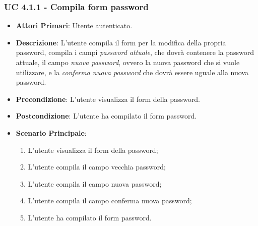 			\subsubsection{UC 4.1.1 - Compila form password}
			\begin{itemize}
				\item \textbf{Attori Primari}: Utente autenticato.
				\item \textbf{Descrizione}: L'utente compila il form per la modifica della propria password, compila i campi \textit{password attuale}, che dovrà contenere la password attuale, il campo \textit{nuova password}, ovvero la nuova password che si vuole utilizzare, e la \textit{conferma nuova password} che dovrà essere uguale alla nuova password.
				\item \textbf{Precondizione}: L'utente visualizza il form della password.
				\item \textbf{Postcondizione}: L'utente ha compilato il form password.
				\item \textbf{Scenario Principale}:
				\begin{enumerate}
					\item L'utente visualizza il form della password;
					\item L'utente compila il campo vecchia password;
					\item L'utente compila il campo nuova password;
					\item L'utente compila il campo conferma nuova password;
					\item L'utente ha compilato il form password.
				\end{enumerate}
			\end{itemize}

